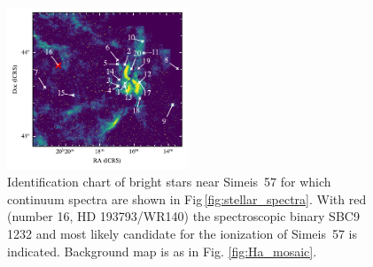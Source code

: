 \documentclass{aa}
\begin{document}
\begin{figure}
\includegraphics[width=0.48\textwidth]{Simeis_Bright_Stars.pdf}
\centering
\caption{Identification chart of bright stars near Simeis~57 for which
  continuum spectra are shown in Fig\,\ref{fig:stellar_spectra}. With 
  red (number 16, HD 193793/WR140) the spectroscopic binary SBC9 1232
  \citep{Pourbaix2004} and most likely candidate for the ionization of 
  Simeis~57 is indicated. Background map is as in Fig.
  \ref{fig:Ha_mosaic}.}
\label{fig:bright_stars}
\end{figure}
\end{document}

